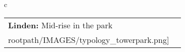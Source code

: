 \begin{table}[H]
        \begin{tabular}{c}
        \begin{tabular}{m{1.5in} m{2in}}
\textbf{Linden:} {Mid-rise in the park} & \texttt{[image: \\rootpath/IMAGES/typology\_towerpark.png]}
\end{tabular}\end{tabular}
        \end{table}
